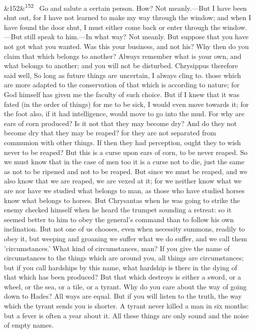 \documentclass[12pt]{article}
\newcommand{\para}[1][]{\par\noindent\ifx&#1&\else\textsuperscript{\footnotesize #1}~\fi}
\begin{document}
\para[152] Go and salute a certain person. How? Not meanly.—But I have been shut out, for I have not learned to make my way through the window; and when I have found the door shut, I must either come back or enter through the window.—But still speak to him.—In what way? Not meanly. But suppose that you have not got what you wanted. Was this your business, and not his? Why then do you claim that which belongs to another? Always remember what is your own, and what belongs to another; and you will not be disturbed. Chrysippus therefore said well, So long as future things are uncertain, I always cling to. those which are more adapted to the conservation of that which is according to nature; for God himself has given me the faculty of such choice. But if I knew that it was fated (in the order of things) for me to be sick, I would even move towards it; for the foot also, if it had intelligence, would move to go into the mud. For why are ears of corn produced? Is it not that they may become dry? And do they not become dry that they may be reaped? for they are not separated from communion with other things. If then they had perception, ought they to wish never to be reaped? But this is a curse upon ears of corn, to be never reaped. So we must know that in the case of men too it is a curse not to die, just the same as not to be ripened and not to be reaped. But since we must be reaped, and we also know that we are reaped, we are vexed at it; for we neither know what we are nor have we studied what belongs to man, as those who have studied horses know what belongs to horses. But Chrysantas when he was going to strike the enemy checked himself when he heard the trumpet sounding a retreat: so it seemed better to him to obey the general's command than to follow his own inclination. But not one of us chooses, even when necessity summons, readily to obey it, but weeping and groaning we suffer what we do suffer, and we call them 'circumstances.' What kind of circumstances, man? If you give the name of circumstances to the things which are around you, all things are circumstances; but if you call hardships by this name, what hardship is there in the dying of that which has been produced? But that which destroys is either a sword, or a wheel, or the sea, or a tile, or a tyrant. Why do you care about the way of going down to Hades? All ways are equal. But if you will listen to the truth, the way which the tyrant sends you is shorter. A tyrant never killed a man in six months: but a fever is often a year about it. All these things are only sound and the noise of empty names.
\end{document}
